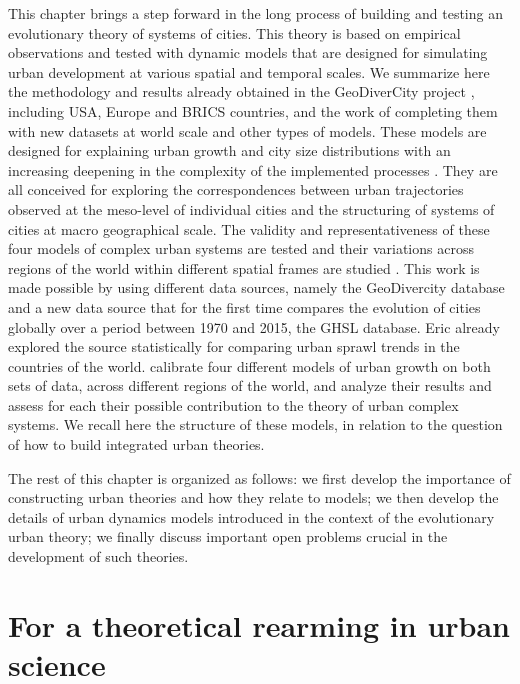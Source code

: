 \documentclass[10pt]{article}
\begin{document}
This chapter brings a step forward in the long process of building and testing an evolutionary theory of systems of cities. This theory is based on empirical observations and tested with dynamic models that are designed for simulating urban development at various spatial and temporal scales. We summarize here the methodology and results already obtained in the GeoDiverCity project \citep{pumain2015multilevel,cura2017old,pumain2017urban}, including USA, Europe and BRICS countries, and the work of \cite{raimbault2020empowering} completing them with new datasets at world scale and other types of models. These models are designed for explaining urban growth and city size distributions with an increasing deepening in the complexity of the implemented processes \cite{cottineau2015growing}. They are all conceived for exploring the correspondences between urban trajectories observed at the meso-level of individual cities and the structuring of systems of cities at macro geographical scale. The validity and representativeness of these four models of complex urban systems are tested and their variations across regions of the world within different spatial frames are studied \citep{raimbault2018calibration,raimbault2020indirect}. This work is made possible by using different data sources, namely the GeoDivercity database and a new data source that for the first time compares the evolution of cities globally over a period between 1970 and 2015, the GHSL database. Eric \cite{denis2020more} already explored the source statistically for comparing urban sprawl trends in the countries of the world. \cite{raimbault2020empowering} calibrate four different models of urban growth on both sets of data, across different regions of the world, and analyze their results and assess for each their possible contribution to the theory of urban complex systems. We recall here the structure of these models, in relation to the question of how to build integrated urban theories.

The rest of this chapter is organized as follows: we first develop the importance of constructing urban theories and how they relate to models; we then develop the details of urban dynamics models introduced in the context of the evolutionary urban theory; we finally discuss important open problems crucial in the development of such theories.


\section{For a theoretical rearming in urban science}
\end{document}
